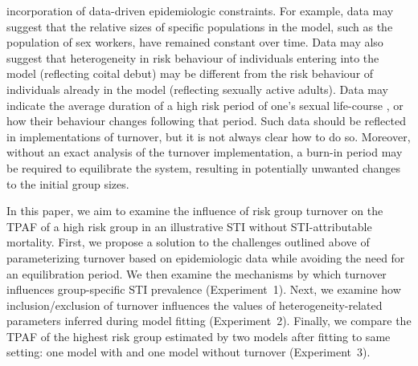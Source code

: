 incorporation of data-driven epidemiologic constraints.
For example, data may suggest
that the relative sizes of specific populations in the model,
such as the population of sex workers,
have remained constant over time. %
Data may also suggest that heterogeneity in risk behaviour
of individuals entering into the model (reflecting coital debut)
may be different from the risk behaviour
of individuals already in the model (reflecting sexually active adults). %
Data may indicate the average duration
of a high risk period of one's sexual life-course \citep{Watts2010}, %
or how their behaviour changes following that period. %
Such data should be reflected in implementations of turnover,
but it is not always clear how to do so.
Moreover, without an exact analysis of the turnover implementation,
a burn-in period may be required to equilibrate the system,
resulting in potentially unwanted changes to the initial group sizes.
\par
In this paper, we aim to examine the influence of risk group turnover
on the TPAF of a high risk group
in an illustrative STI without STI-attributable mortality.
First, we propose a solution to the challenges outlined above
of parameterizing turnover based on epidemiologic data
while avoiding the need for an equilibration period.
We then examine the mechanisms by which turnover
influences group-specific STI prevalence
(Experiment~1).
Next, we examine how inclusion/exclusion of turnover influences
the values of heterogeneity-related parameters inferred during model fitting
(Experiment~2).
Finally, we compare the TPAF of the highest risk group
estimated by two models after fitting to same setting:
one model with and one model without turnover
(Experiment~3).